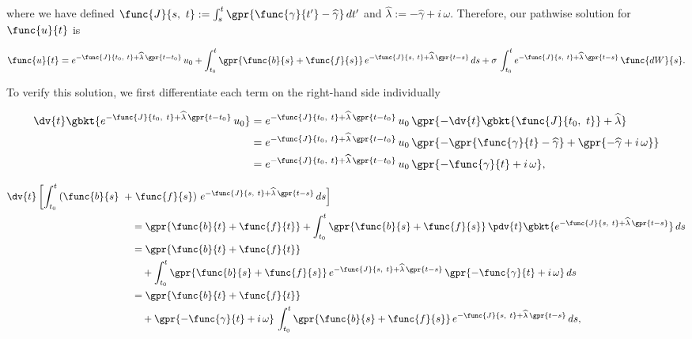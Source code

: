 where we have defined $\func{J}{s,\ t} := \int_{s}^{t} \gpr{\func{\gamma}{t'} - \widehat{\gamma}}\,dt'$ and $\widehat{\lambda} := -\widehat{\gamma} + i\,\omega$. Therefore, our pathwise solution for $\func{u}{t}$ is

\begin{equation}
    \func{u}{t} = e^{-\func{J}{t_0,\ t} + \widehat{\lambda}\,\gpr{t - t_0}}\,u_0 + \int_{t_0}^{t} \gpr{\func{b}{s} + \func{f}{s}}\,e^{-\func{J}{s,\ t} + \widehat{\lambda}\,\gpr{t - s}}\,ds + \sigma\,\int_{t_{0}}^{t} e^{-\func{J}{s,\ t} + \widehat{\lambda}\,\gpr{t - s}}\,\func{dW}{s}. \label{eqn:pathwise_u}
\end{equation}

To verify this solution, we first differentiate each term on the right-hand side individually

\begin{align}
    \dv{t} \gbkt{e^{-\func{J}{t_0,\ t} + \widehat{\lambda}\,\gpr{t - t_0}}\,u_0} &= e^{-\func{J}{t_0,\ t} + \widehat{\lambda}\,\gpr{t - t_0}}\,u_0\,\gpr{-\dv{t}\gbkt{\func{J}{t_0,\ t}} + \widehat{\lambda}} \nonumber \\
    	&= e^{-\func{J}{t_0,\ t} + \widehat{\lambda}\,\gpr{t - t_0}}\,u_0\,\gpr{-\gpr{\func{\gamma}{t} - \widehat{\gamma}} + \gpr{-\widehat{\gamma} + i\,\omega}} \nonumber \\
    	&= e^{-\func{J}{t_0,\ t} + \widehat{\lambda}\,\gpr{t - t_0}}\,u_0\,\gpr{-\func{\gamma}{t} + i\,\omega},
\end{align}

\begin{align}
    \dv{t} \left[\int_{t_0}^{t} \left(\func{b}{s}\right. \right.&\left. + \left.\func{f}{s}\right)\,e^{-\func{J}{s,\ t} + \widehat{\lambda}\,\gpr{t - s}}\,ds \right] \nonumber \\
    	&\quad = \gpr{\func{b}{t} + \func{f}{t}} + \int_{t_0}^{t} \gpr{\func{b}{s} + \func{f}{s}}\,\pdv{t} \gbkt{e^{-\func{J}{s,\ t} + \widehat{\lambda}\,\gpr{t - s}}}\,ds \nonumber \\
    	&\quad = \gpr{\func{b}{t} + \func{f}{t}} \nonumber \\
    	&\qquad + \int_{t_0}^{t} \gpr{\func{b}{s} + \func{f}{s}}\,e^{-\func{J}{s,\ t} + \widehat{\lambda}\,\gpr{t - s}}\,\gpr{-\func{\gamma}{t} + i\,\omega}\,ds \nonumber \\
    	&\quad = \gpr{\func{b}{t} + \func{f}{t}} \nonumber \\
    	&\qquad + \gpr{-\func{\gamma}{t} + i\,\omega}\,\int_{t_0}^{t} \gpr{\func{b}{s} + \func{f}{s}}\,e^{-\func{J}{s,\ t} + \widehat{\lambda}\,\gpr{t - s}}\,ds,
\end{align}

